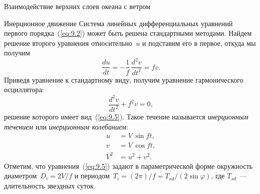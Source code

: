 \begin{chapter}{Взаимодействие верхних слоев океана с ветром}
\begin{section}{Инерционное движение}
Система линейных дифференциальных уравнений первого порядка~(\ref{eq:9.2})
может быть решена стандартными методами. Найдем решение второго уравнения
относительно~$u$ и подставим его в первое, откуда мы получим
\begin{displaymath}
 \frac{du}{dt}=-\frac{1}{f}\,\frac{d^2v}{dt^2}=fv.
\end{displaymath}
Приведя уравнение к стандартному виду, получим уравнение гармонического
осциллятора:
\begin{equation}
 \frac{d^2v}{dt^2} + f^2v = 0,
\end{equation}
решение которого имеет вид~(\ref{eq:9.5}). 
Такое течение называется 
\emph{инерционным течением} 
или \emph{инерционным колебанием}:
\begin{equation}\label{eq:9.5}
\boxed{\begin{aligned}
 u    &= V\, \sin ft, \\
 v    &= V\, \cos ft, \\
 V^2  &= u^2+v^2. \end{aligned}}
\end{equation}
Отметим, что уравнения~(\ref{eq:9.5}) задают в параметрической форме
окружность диаметром~$D_i = 2V/f$ и 
периодом~$T_i = (2\pi)/f = T_{sd}/(2\sin\varphi)$, 
где $T_{sd}$~--- длительность звездных суток.
%


\end{section}
\end{chapter}

